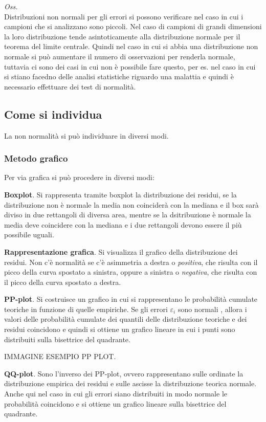 \textit{Oss.}\\
Distribuzioni non normali per gli errori si possono verificare nel caso in cui i campioni che si analizzano sono piccoli. Nel caso di campioni di grandi dimensioni la loro distribuzione tende asintoticamente alla distribuzione normale per il teorema del limite centrale. Quindi nel caso in cui si abbia una distribuzione non normale si può aumentare il numero di osservazioni per renderla normale, tuttavia ci sono dei casi in cui non è possibile fare questo, per es. nel caso in cui si stiano facedno delle analisi statistiche riguardo una malattia e quindi è necessario effettuare dei test di normalità.

\subsection{Come si individua}
La non normalità si può individuare in diversi modi.

\subsubsection{Metodo grafico}
Per via grafica si può procedere in diversi modi:

\textbf{Boxplot}. Si rappresenta tramite boxplot la distribuzione dei residui, se la distribuzione non è normale la media non coinciderà con la mediana e il box sarà diviso in due rettangoli di diversa area, mentre se la dsitribuzione è normale la media deve coincidere con la mediana e i due rettangoli devono essere il più possibile uguali.

\textbf{Rappresentazione grafica}. Si visualizza il grafico della distribuzione dei residui. Non c'è normalità se c'è asimmetria a destra o \textit{positiva}, che risulta con il picco della curva spostato a sinistra, oppure a sinistra o \textit{negativa}, che risulta con il picco della curva spostato a destra.

\textbf{PP-plot}. Si costruisce un grafico in cui si rappresentano le probabilità cumulate teoriche in funzione di quelle empiriche. Se gli errori $\varepsilon_i$ sono normali , allora i valori delle probabilità cumulate dei quantili delle distribuzione teoriche e dei residui coincidono e quindi si ottiene un grafico lineare in cui i punti sono distribuiti sulla bisettrice del quadrante.

IMMAGINE ESEMPIO PP PLOT.

\textbf{QQ-plot}. Sono l'inverso dei PP-plot, ovvero rappresentano sulle ordinate la distribuzione empirica dei residui e sulle ascisse la distribuzione teorica normale. Anche qui nel caso in cui gli errori siano distribuiti in modo normale le probabilità coincidono e si ottiene un grafico lineare sulla bisettrice del quadrante.

